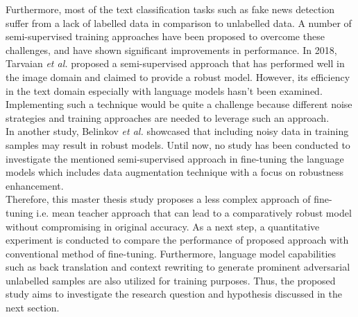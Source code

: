 \documentclass[%
	BCOR=8mm, %
	DIV=12,
	toc=bibliography, %
	toc=listof, %
	oneside, %
	egregdoesnotlikesansseriftitles, %
	]{scrbook}
\begin{document}
Furthermore, most of the text classification tasks such as fake news detection suffer from a lack of labelled data in comparison to unlabelled data. A number of semi-supervised training approaches have been proposed to overcome these challenges, and  have shown significant improvements in performance. In 2018, Tarvaian \textit{et al.} \cite{tarvainen_mean_2018} proposed a semi-supervised approach that has performed well in the image domain and  claimed to provide a robust model. However, its efficiency in the text domain especially with language models hasn't been examined. Implementing such a technique would be quite a challenge because different noise strategies and training approaches are needed to leverage such an approach.\\
In another study, Belinkov \textit{et al.} \cite{belinkov_synthetic_2018} showcased that including noisy data in training samples may result in robust models.  Until now, no study has been conducted to investigate the mentioned semi-supervised approach in fine-tuning the language models which includes data augmentation technique with a focus on robustness enhancement. \\
Therefore, this master thesis study proposes a less complex approach of fine-tuning i.e. mean teacher approach that can lead to a comparatively robust model without compromising in original accuracy. As a next step, a quantitative experiment is conducted to compare the performance of proposed approach with conventional method of fine-tuning. Furthermore, language model capabilities such as back translation and context rewriting to generate prominent adversarial unlabelled samples are also utilized for training purposes. Thus, the proposed study aims to investigate the research question and hypothesis discussed in the next section.
\end{document}
